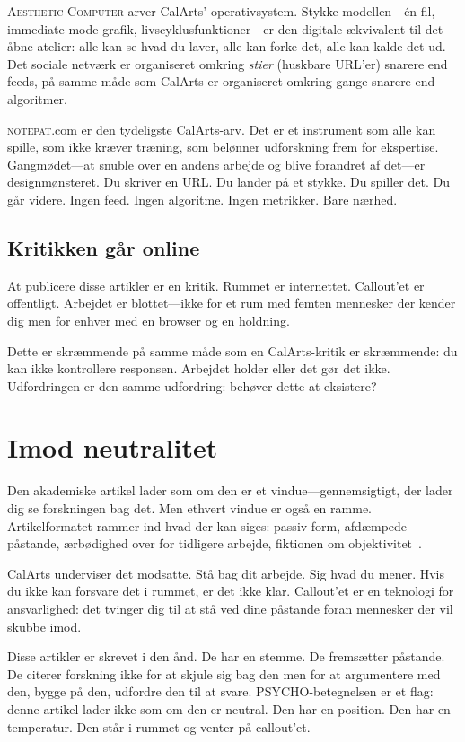 \documentclass[10pt,letterpaper,twocolumn]{article}
\newcommand{\ac}{\textsc{Aesthetic Computer}}
\newcommand{\np}{\textsc{notepat}}
\begin{document}
\ac{} arver CalArts' operativsystem. Stykke-modellen---én fil, immediate-mode grafik, livscyklusfunktioner---er den digitale ækvivalent til det åbne atelier: alle kan se hvad du laver, alle kan forke det, alle kan kalde det ud. Det sociale netværk er organiseret omkring \emph{stier} (huskbare URL'er) snarere end feeds, på samme måde som CalArts er organiseret omkring gange snarere end algoritmer.

\np{}.com er den tydeligste CalArts-arv. Det er et instrument som alle kan spille, som ikke kræver træning, som belønner udforskning frem for ekspertise. Gangmødet---at snuble over en andens arbejde og blive forandret af det---er designmønsteret. Du skriver en URL. Du lander på et stykke. Du spiller det. Du går videre. Ingen feed. Ingen algoritme. Ingen metrikker. Bare nærhed.

\subsection{Kritikken går online}

At publicere disse artikler er en kritik. Rummet er internettet. Callout'et er offentligt. Arbejdet er blottet---ikke for et rum med femten mennesker der kender dig men for enhver med en browser og en holdning.

Dette er skræmmende på samme måde som en CalArts-kritik er skræmmende: du kan ikke kontrollere responsen. Arbejdet holder eller det gør det ikke. Udfordringen er den samme udfordring: behøver dette at eksistere?

\section{Imod neutralitet}

Den akademiske artikel lader som om den er et vindue---gennemsigtigt, der lader dig se forskningen bag det. Men ethvert vindue er også en ramme. Artikelformatet rammer ind hvad der kan siges: passiv form, afdæmpede påstande, ærbødighed over for tidligere arbejde, fiktionen om objektivitet~\citep{freire1970pedagogy}.

CalArts underviser det modsatte. Stå bag dit arbejde. Sig hvad du mener. Hvis du ikke kan forsvare det i rummet, er det ikke klar. Callout'et er en teknologi for ansvarlighed: det tvinger dig til at stå ved dine påstande foran mennesker der vil skubbe imod.

Disse artikler er skrevet i den ånd. De har en stemme. De fremsætter påstande. De citerer forskning ikke for at skjule sig bag den men for at argumentere med den, bygge på den, udfordre den til at svare. PSYCHO-betegnelsen er et flag: denne artikel lader ikke som om den er neutral. Den har en position. Den har en temperatur. Den står i rummet og venter på callout'et.
\end{document}
